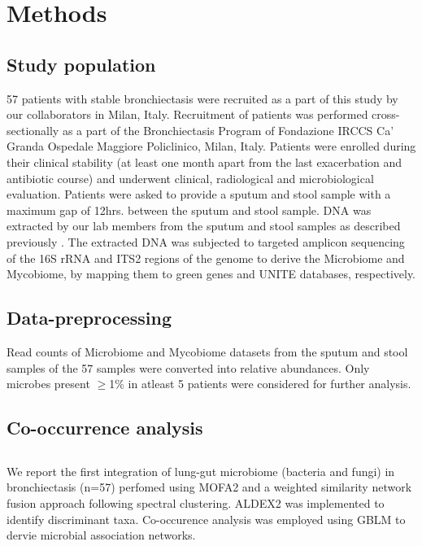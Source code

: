 \section{Methods}

\subsection{Study population}
57 patients with stable bronchiectasis were recruited as a part of this study by our collaborators in Milan, Italy. Recruitment of patients was performed cross-sectionally as a part of the Bronchiectasis Program of Fondazione IRCCS Ca' Granda Ospedale Maggiore Policlinico, Milan, Italy. Patients were enrolled during their clinical stability (at least one month apart from the last exacerbation and antibiotic course) and underwent clinical, radiological and microbiological evaluation. Patients were asked to provide a sputum and stool sample with a maximum gap of 12hrs. between the sputum and stool sample. DNA was extracted by our lab members from the sputum and stool samples as described previously \cite{Mac1800766}. The extracted DNA was subjected to targeted amplicon sequencing of the 16S rRNA and ITS2 regions of the genome to derive the Microbiome and Mycobiome, by mapping them to green genes and UNITE databases, respectively.

\subsection{Data-preprocessing}
Read counts of Microbiome and Mycobiome datasets from the sputum and stool samples of the 57 samples were converted into relative abundances. Only microbes present $\geq$1\% in atleast 5 patients were considered for further analysis. 

\subsection{Co-occurrence analysis}


\subsection{}

We report the first integration of lung-gut microbiome (bacteria and fungi) in bronchiectasis (n=57) perfomed using MOFA2 and a weighted similarity network fusion approach following spectral clustering. ALDEX2 was implemented to identify discriminant taxa. Co-occurence analysis was employed using GBLM to dervie microbial association networks.